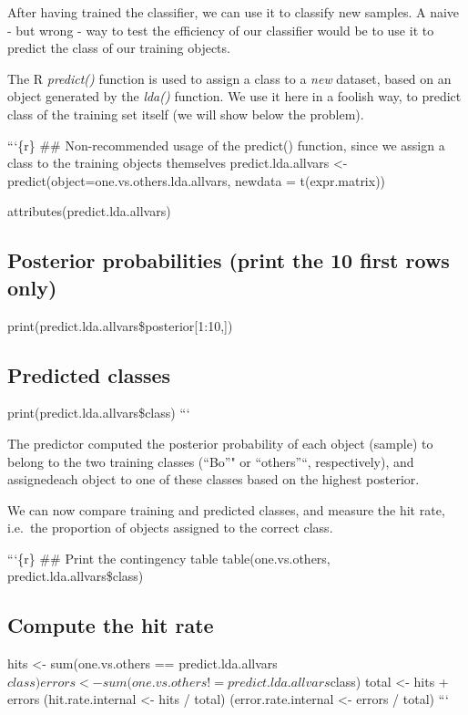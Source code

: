 After having trained the classifier, we can use it to classify new
samples. A naive - but {wrong} - way to test the efficiency of our
classifier would be to use it to predict the class of our training
objects.

The R \emph{predict()} function is used to assign a class to a
\emph{new} dataset, based on an object generated by the \emph{lda()}
function. We use it here in a foolish way, to predict class of the
training set itself (we will show below the problem).

```\{r\} \#\# Non-recommended usage of the predict() function, since we
assign a class to the training objects themselves predict.lda.allvars
\textless{}- predict(object=one.vs.others.lda.allvars, newdata =
t(expr.matrix))

attributes(predict.lda.allvars)

\subsection{Posterior probabilities (print the 10 first rows
only)}\label{posterior-probabilities-print-the-10-first-rows-only}

print(predict.lda.allvars\$posterior{[}1:10,{]})

\subsection{Predicted classes}\label{predicted-classes}

print(predict.lda.allvars\$class) ```

The predictor computed the {posterior probability} of each object
(sample) to belong to the two training classes (``Bo''" or ``others''``,
respectively), and assignedeach object to one of these classes based on
the highest posterior.

We can now compare training and predicted classes, and measure the {hit
rate}, i.e.~the proportion of objects assigned to the correct class.

```\{r\} \#\# Print the contingency table table(one.vs.others,
predict.lda.allvars\$class)

\subsection{Compute the hit rate}\label{compute-the-hit-rate}

hits \textless{}- sum(one.vs.others ==
predict.lda.allvars$class) errors <- sum(one.vs.others != predict.lda.allvars$class)
total \textless{}- hits + errors (hit.rate.internal \textless{}- hits /
total) (error.rate.internal \textless{}- errors / total) ```


